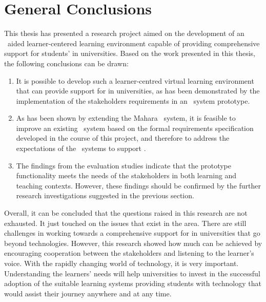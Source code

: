 \section{General Conclusions}

This thesis has presented a research project aimed on the development of an
\ep~aided learner-centered learning environment capable of providing
comprehensive support for students' \LLLs in universities. Based on the work
presented in this thesis, the following conclusions can be drawn:
\begin{enumerate}
  \item It is possible to develop such a learner-centred virtual learning
  environment that can provide support for \LLLs in universities, as has been
  demonstrated by the implementation of the stakeholders requirements in an
  \ep~system prototype.
  \item As has been shown by extending the Mahara \ep~system, it is feasible to
  improve an existing \ep~system based on the formal requirements specification
  developed in the course of this project, and therefore to address the
  expectations of the \ep~systems to support \LLLsn.
  \item The findings from the evaluation studies indicate that the prototype
  functionality meets the needs of the stakeholders in both learning and
  teaching contexts. However, these findings should be confirmed by the further
  research investigations suggested in the previous section.
\end{enumerate}

Overall, it can be concluded that the questions raised in this research are not
exhausted. It just touched on the issues that exist in the area. There are
still challenges in working towards a comprehensive support for \LLLs in
universities that go beyond technologies. However, this research showed how much
can be achieved by encouraging cooperation between the stakeholders and
listening to the learner's voice. With the rapidly changing world of technology,
it is very important. Understanding the learners' needs will help universities
to invest in the successful adoption of the suitable learning systems providing
students with technology that would assist their \LLLs journey anywhere and at
any time.

